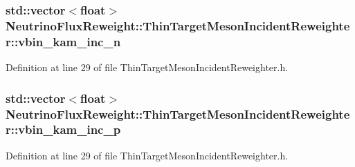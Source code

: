 \hypertarget{class_neutrino_flux_reweight_1_1_thin_target_meson_incident_reweighter_acf30f4374e9357a5c8b40ff459f4d2a8}{
\subsubsection[{vbin\-\_\-kam\-\_\-inc\-\_\-n}]{\setlength{\rightskip}{0pt plus 5cm}std\-::vector$<$float$>$ Neutrino\-Flux\-Reweight\-::\-Thin\-Target\-Meson\-Incident\-Reweighter\-::vbin\-\_\-kam\-\_\-inc\-\_\-n}}\label{class_neutrino_flux_reweight_1_1_thin_target_meson_incident_reweighter_acf30f4374e9357a5c8b40ff459f4d2a8}


Definition at line 29 of file Thin\-Target\-Meson\-Incident\-Reweighter.\-h.

\hypertarget{class_neutrino_flux_reweight_1_1_thin_target_meson_incident_reweighter_a3921cfcf4c109696542983913db1927e}{
\subsubsection[{vbin\-\_\-kam\-\_\-inc\-\_\-p}]{\setlength{\rightskip}{0pt plus 5cm}std\-::vector$<$float$>$ Neutrino\-Flux\-Reweight\-::\-Thin\-Target\-Meson\-Incident\-Reweighter\-::vbin\-\_\-kam\-\_\-inc\-\_\-p}}\label{class_neutrino_flux_reweight_1_1_thin_target_meson_incident_reweighter_a3921cfcf4c109696542983913db1927e}


Definition at line 29 of file Thin\-Target\-Meson\-Incident\-Reweighter.\-h.

